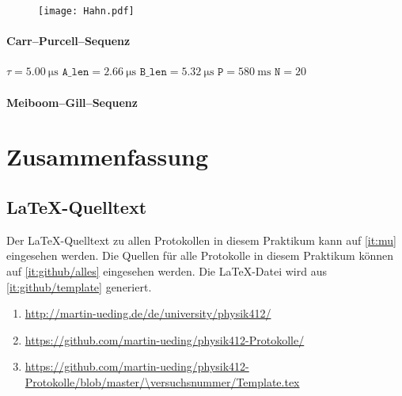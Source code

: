 \begin{figure}[htbp]
    \centering
    \texttt{[image: Hahn.pdf]}
    \caption{%
    }
    \label{fig:hahn}
\end{figure}

\FloatBarrier
\subsubsection{Carr–Purcell–Sequenz}

$\tau = \SI{5.00}{\micro\second}$
$\texttt{A\_len} = \SI{2.66}{\micro\second}$
$\texttt{B\_len} = \SI{5.32}{\micro\second}$
$\texttt{P} = \SI{580}{\milli\second}$
$\texttt{N} = \num{20}$

\FloatBarrier
\subsubsection{Meiboom–Gill–Sequenz}


\FloatBarrier
\chapter{Zusammenfassung}

\fehlt


\FloatBarrier
\begin{appendix}
    \FloatBarrier
    \chapter{\LaTeX-Quelltext}

    Der \LaTeX-Quelltext zu allen Protokollen in diesem Praktikum kann auf
    \ref{it:mu} eingesehen werden. Die Quellen für alle Protokolle in diesem
    Praktikum können auf \ref{it:github/alles} eingesehen werden. Die
    \LaTeX-Datei wird aus \ref{it:github/template} generiert.

    \begin{enumerate}
        \item
            \label{it:mu}
            \url{http://martin-ueding.de/de/university/physik412/}
        \item
            \label{it:github/alles}
            \url{https://github.com/martin-ueding/physik412-Protokolle/}
        \item
            \label{it:github/template}
            \url{https://github.com/martin-ueding/physik412-Protokolle/blob/master/\versuchsnummer/Template.tex}
    \end{enumerate}
\end{appendix}

